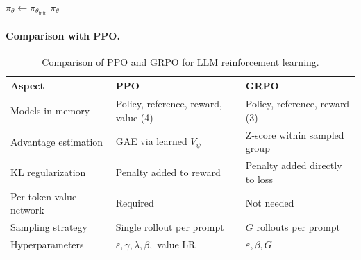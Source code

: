 \documentclass[12pt,a4paper]{report}
\begin{document}
\begin{algorithm}[t]
\DontPrintSemicolon
\SetAlgoLined
{}
\BlankLine
$\pi_\theta \leftarrow \pi_{\theta_{\text{init}}}$ \;
\Return $\pi_\theta$ \;
\caption{Group Relative Policy Optimization (GRPO)}
\label{alg:grpo}
\end{algorithm}

\paragraph{Comparison with PPO.}

\begin{table}[t]
\centering
\caption{Comparison of PPO and GRPO for LLM reinforcement learning.}
\label{tab:ppo-vs-grpo}
\small
\begin{tabular}{@{}lll@{}}
\toprule
\textbf{Aspect} & \textbf{PPO} & \textbf{GRPO} \\
\midrule
Models in memory &
  Policy, reference, reward, value (4) &
  Policy, reference, reward (3) \\
Advantage estimation &
  GAE via learned $V_\psi$ &
  Z-score within sampled group \\
KL regularization &
  Penalty added to reward &
  Penalty added directly to loss \\
Per-token value network &
  Required &
  Not needed \\
Sampling strategy &
  Single rollout per prompt &
  $G$ rollouts per prompt \\
Hyperparameters &
  $\varepsilon, \gamma, \lambda, \beta,$ value LR &
  $\varepsilon, \beta, G$ \\
\bottomrule
\end{tabular}
\end{table}
\end{document}
